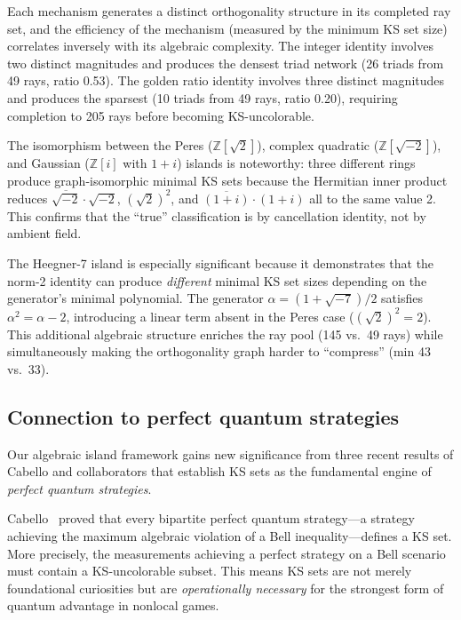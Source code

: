 \documentclass[12pt,a4paper]{article}
\newcommand{\Z}{\mathbb{Z}}
\begin{document}
Each mechanism generates a distinct orthogonality structure in its completed ray set, and the efficiency of the mechanism (measured by the minimum KS set size) correlates inversely with its algebraic complexity. The integer identity involves two distinct magnitudes and produces the densest triad network (26 triads from 49 rays, ratio 0.53). The golden ratio identity involves three distinct magnitudes and produces the sparsest (10 triads from 49 rays, ratio 0.20), requiring completion to 205 rays before becoming KS-uncolorable.

The isomorphism between the Peres ($\Z[\sqrt{2}]$), complex quadratic ($\Z[\sqrt{-2}]$), and Gaussian ($\Z[i]$ with $1+i$) islands is noteworthy: three different rings produce graph-isomorphic minimal KS sets because the Hermitian inner product reduces $\overline{\sqrt{-2}} \cdot \sqrt{-2}$, $(\sqrt{2})^2$, and $\overline{(1+i)} \cdot (1+i)$ all to the same value 2. This confirms that the ``true'' classification is by cancellation identity, not by ambient field.

The Heegner-7 island is especially significant because it demonstrates that the norm-2 identity can produce \emph{different} minimal KS set sizes depending on the generator's minimal polynomial. The generator $\alpha = (1+\sqrt{-7})/2$ satisfies $\alpha^2 = \alpha - 2$, introducing a linear term absent in the Peres case ($(\sqrt{2})^2 = 2$). This additional algebraic structure enriches the ray pool (145 vs.\ 49 rays) while simultaneously making the orthogonality graph harder to ``compress'' (min 43 vs.\ 33).

\subsection{Connection to perfect quantum strategies}\label{sec:cabello}

Our algebraic island framework gains new significance from three recent results of Cabello and collaborators that establish KS sets as the fundamental engine of \emph{perfect quantum strategies}.

Cabello~\cite{Cabello2024bipartite} proved that every bipartite perfect quantum strategy---a strategy achieving the maximum algebraic violation of a Bell inequality---defines a KS set. More precisely, the measurements achieving a perfect strategy on a Bell scenario must contain a KS-uncolorable subset. This means KS sets are not merely foundational curiosities but are \emph{operationally necessary} for the strongest form of quantum advantage in nonlocal games.
\end{document}
